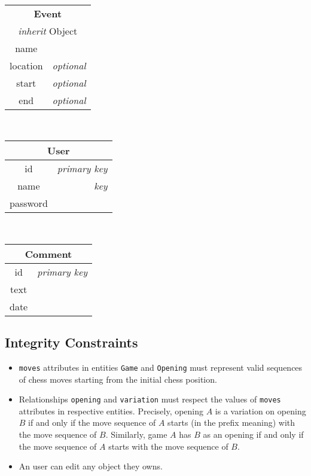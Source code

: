 \documentclass{article}
\begin{document}
\begin{table}[ht!]
\begin{subtable}{3.5cm}
    \end{subtable}
    ~
    \begin{subtable}{3.5cm}
	\begin{tabular}[t]{|cr|}
	\hline
	\multicolumn{2}{|c|}{\textbf{Event}} \\
	\multicolumn{2}{|c|}{\emph{inherit} Object} \\
	\hline
	name     &                  \\
	location & \emph{optional}    \\
	start    & \emph{optional}    \\
	end      & \emph{optional}    \\
	\hline
	\end{tabular}
    \end{subtable}
    ~
    \begin{subtable}{3.5cm}
	\begin{tabular}[t]{|cr|}
	\hline
	\multicolumn{2}{|c|}{\textbf{User}} \\
	\hline
	id       & \emph{primary key} \\
	name     & \emph{key}         \\
	password &                  \\
	\hline
	\end{tabular}
    \end{subtable}
    ~
    \begin{subtable}{3.5cm}
	\begin{tabular}[t]{|cr|}
	\hline
	\multicolumn{2}{|c|}{\textbf{Comment}} \\
	\hline
	id     & \emph{primary key} \\
	text   &                  \\
	date   &                  \\
	\hline
	\end{tabular}
    \end{subtable}
\end{table}


\subsection{Integrity Constraints}
\begin{itemize}
\item \verb|moves| attributes in entities \verb|Game| and \verb|Opening| must represent
valid sequences of chess moves starting from the initial chess position.

\item Relationships \verb|opening| and \verb|variation| must respect the values of \verb|moves|
attributes in respective entities.
Precisely, opening $A$ is a variation on opening $B$ if and only if the move sequence
of $A$ starts (in the prefix meaning) with the move sequence of $B$.
Similarly, game $A$ has $B$ as an opening if and only if the move sequence of $A$ starts
with the move sequence of $B$.

\item An user can edit any object they owns.
\end{itemize}
\end{document}
